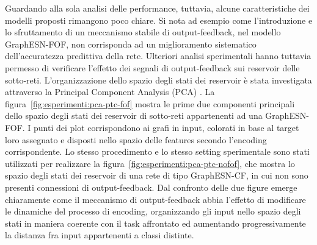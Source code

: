 Guardando alla sola analisi delle performance, tuttavia, alcune caratteristiche dei modelli proposti rimangono poco chiare. Si nota ad esempio come l'introduzione e lo sfruttamento di un meccanismo stabile di output-feedback, nel modello GraphESN-FOF, non corrisponda ad un miglioramento sistematico dell'accuratezza predittiva della rete. Ulteriori analisi sperimentali hanno tuttavia permesso di verificare l'effetto dei segnali di output-feedback sui reservoir delle sotto-reti.
L'organizzazione dello spazio degli stati dei reservoir è stata investigata attraverso la Principal Component Analysis (PCA) \cite{Jolliffe:PCA}. La figura~\vref{fig:esperimenti:pca-ptc-fof} mostra le prime due componenti principali dello spazio degli stati dei reservoir di sotto-reti appartenenti ad una GraphESN-FOF. I punti dei plot corrispondono ai grafi in input, colorati in base al target loro assegnato e disposti nello spazio delle features secondo l'encoding corrispondente. Lo stesso procedimento e lo stesso setting sperimentale sono stati utilizzati per realizzare la figura~\vref{fig:esperimenti:pca-ptc-nofof}, che mostra lo spazio degli stati dei reservoir di una rete di tipo GraphESN-CF, in cui non sono presenti connessioni di output-feedback. Dal confronto delle due figure emerge chiaramente come il meccanismo di output-feedback abbia l'effetto di modificare le dinamiche del processo di encoding, organizzando gli input nello spazio degli stati in maniera coerente con il task affrontato ed aumentando progressivamente la distanza fra input appartenenti a classi distinte. 
%
